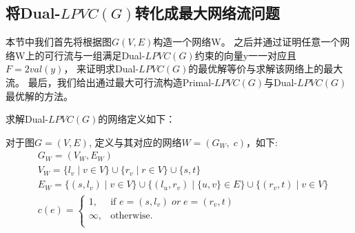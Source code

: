 \subsection{将Dual-$LPVC(G)$转化成最大网络流问题} \label{TransformToNetwork}
本节中我们首先将根据图$G(V, E)$构造一个网络W。
之后并通过证明任意一个网络W上的可行流与一组满足Dual-$LPVC(G)$约束的向量y一一对应且$F = 2val(y)$，
来证明求Dual-$LPVC(G)$的最优解等价与求解该网络上的最大流。
最后，我们给出通过最大可行流构造Primal-$LPVC(G)$与Dual-$LPVC(G)$最优解的方法。

求解Dual-$LPVC(G)$的网络定义如下：
\begin{definition} \label{NetworkDefintion}
对于图$G = (V, E)$, 定义与其对应的网络$W = (G_W,\; c)$，如下:
\begin{equation*}\begin{aligned}
    &G_W = (V_W, E_W) \\
    &V_W = \{l_v\;|\;v \in V\} \cup \{r_v\;|\;r \in V\} \cup \{ s, t \} \\
    &E_W = \{(s, l_v)\;|\;v \in V\} \cup \{(l_u, r_v)\;|\;\{u, v\} \in E\} \cup \{(r_v, t)\;|\;v \in V\}\\
    &c(e) =   \begin{cases}
        1, & \mbox{if } e = (s, l_v)\;or\;e = (r_v, t)\\
        \infty, & \mbox{otherwise.}\\
  \end{cases}
\end{aligned}\end{equation*}
\end{definition}

